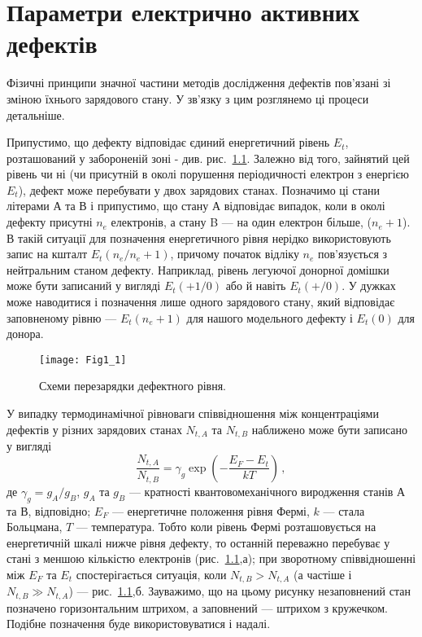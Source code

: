 \chapter{Параметри електрично активних \\ дефектів}\label{chapLevels}
Фізичні принципи значної частини методів дослідження дефектів
пов'язані зі зміною їхнього зарядового стану.
У зв'язку з цим розглянемо ці процеси детальніше.

Припустимо, що дефекту відповідає єдиний енергетичний рівень $E_t$,
розташований у забороненій зоні - див. рис.~\ref{F11}.
Залежно від того, зайнятий цей рівень чи ні (чи присутній в околі
порушення періодичності електрон з енергією $E_t$),
дефект може перебувати у двох зарядових станах.
Позначимо ці стани літерами А та В і припустимо,
що стану А відповідає випадок, коли в околі дефекту присутні $n_e$
електронів, а стану B --- на один електрон більше, ($n_e+1$).
В такій ситуації для позначення енергетичного рівня
нерідко використовують запис на кшталт $E_t(n_e/n_e+1)$,
причому початок відліку $n_e$ пов'язується з нейтральним станом
дефекту.
Наприклад, рівень легуючої донорної домішки
може бути записаний у вигляді $E_t(+1/0)$ або й навіть $E_t(+/0)$.
У дужках може наводитися і позначення лише одного зарядового стану,
який відповідає заповненому рівню ---  $E_t(n_e+1)$ для нашого модельного дефекту
і $E_t(0)$ для донора.

\begin{figure}[b]
\center
\vspace{-5mm}
\texttt{[image: Fig1\_1]}
\vspace{-3mm}
\caption{Схеми перезарядки дефектного рівня.}
\vspace{-3mm}
\label{F11}
\end{figure}

У випадку термодинамічної рівноваги співвідношення між концентраціями
дефектів у різних зарядових станах $N_{t,A}$ та $N_{t,B}$
наближено може бути записано у вигляді
\begin{equation}
\label{NbNa}
 \frac{N_{t,A}}{N_{t,B}}=\gamma_g\exp\left(-\frac{E_F-E_t}{kT}\right)\,,
\end{equation}
де $\gamma_g=g_{A}/g_{B}$,
 $g_{A}$ та $g_{B}$ --- кратності квантовомеханічного виродження станів А та В,
відповідно;
$E_F$ --- енергетичне положення рівня Фермі,
$k$ --- стала Больцмана,
$T$ --- температура.
Тобто коли рівень Фермі розташовується на енергетичній шкалі нижче рівня дефекту,
то останній переважно перебуває у стані з меншою кількістю електронів (рис.~\ref{F11},а);
при зворотному співвідношенні між  $E_F$ та $E_t$  спостерігається ситуація,
коли $N_{t,B}>N_{t,A}$ (а частіше і $N_{t,B}\gg N_{t,A}$) --- рис.~\ref{F11},б.
Зауважимо, що на цьому рисунку незаповнений стан позначено горизонтальним штрихом,
а заповнений --- штрихом з кружечком.
Подібне позначення буде використовуватися і надалі.

